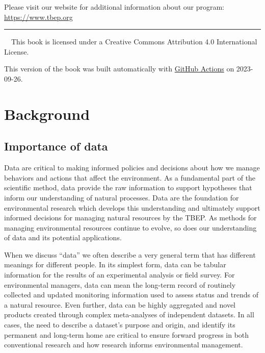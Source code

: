 \documentclass[
]{book}
\begin{document}
Please visit our website for additional information about our program: \url{https://www.tbep.org}

\begin{center}\rule{0.5\linewidth}{0.5pt}\end{center}

~~This book is licensed under a Creative Commons Attribution 4.0 International License.

This version of the book was built automatically with \href{https://github.com/tbep-tech/data-management-sop/actions}{GitHub Actions} on 2023-09-26.

\hypertarget{background}{%
\chapter{Background}\label{background}}

\hypertarget{dataimp}{%
\section{Importance of data}\label{dataimp}}

Data are critical to making informed policies and decisions about how we manage behaviors and actions that affect the environment. As a fundamental part of the scientific method, data provide the raw information to support hypotheses that inform our understanding of natural processes. Data are the foundation for environmental research which develops this understanding and ultimately support informed decisions for managing natural resources by the TBEP. As methods for managing environmental resources continue to evolve, so does our understanding of data and its potential applications.

When we discuss ``data'' we often describe a very general term that has different meanings for different people. In its simplest form, data can be tabular information for the results of an experimental analysis or field survey. For environmental managers, data can mean the long-term record of routinely collected and updated monitoring information used to assess status and trends of a natural resource. Even further, data can be highly aggregated and novel products created through complex meta-analyses of independent datasets. In all cases, the need to describe a dataset's purpose and origin, and identify its permanent and long-term home are critical to ensure forward progress in both conventional research and how research informs environmental management.
\end{document}
